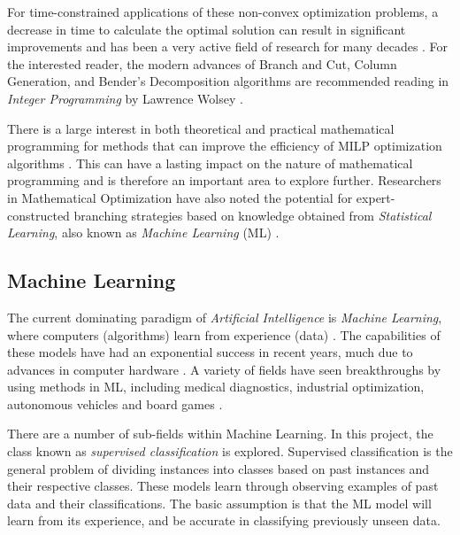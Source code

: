 For time-constrained applications of these non-convex optimization problems, a decrease in time to calculate the optimal solution can result in significant improvements and has been a very active field of research for many decades \cite{wolsey2020integer}. For the interested reader, the modern advances of Branch and Cut, Column Generation, and Bender's Decomposition algorithms are recommended reading in \textit{Integer Programming} by Lawrence Wolsey \cite{wolsey2020integer}.


There is a large interest in both theoretical and practical mathematical programming for methods that can improve the efficiency of \gls{MILP} optimization algorithms \cite{wolsey2020integer}. This can have a lasting impact on the nature of mathematical programming and is therefore an important area to explore further. Researchers in Mathematical Optimization have also noted the potential for expert-constructed branching strategies based on knowledge obtained from \textit{Statistical Learning}, also known as \textit{Machine Learning} (\Gls{ML}) \cite{lodi2017learning}.


\subsection{Machine Learning}

The current dominating paradigm of \textit{Artificial Intelligence} is \textit{Machine Learning}, where computers (algorithms) learn from experience (data) \cite{goodfellow2016deep}. The capabilities of these models have had an exponential success in recent years, much due to advances in computer hardware \cite{goodfellow2016deep}. A variety of fields have seen breakthroughs by using methods in \gls{ML}, including medical diagnostics, industrial optimization, autonomous vehicles and board games \cite{goodfellow2016deep}. 

There are a number of sub-fields within Machine Learning. In this project, the class known as \textit{supervised classification} is explored. Supervised classification is the general problem of dividing instances into classes based on past instances and their respective classes. These models learn through observing examples of past data and their classifications. The basic assumption is that the \gls{ML} model will learn from its experience, and be accurate in classifying previously unseen data. 

